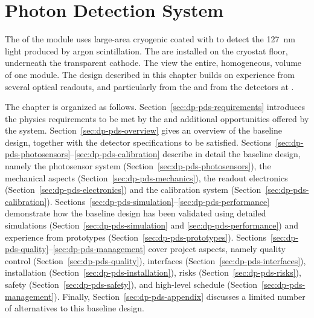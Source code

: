 \chapter{Photon Detection System}
\label{ch:dp-pds}

The  of the \dune \dual module uses large-area cryogenic  coated with  to detect the \SI{127}{\nm} light produced by argon scintillation. The  are installed on the cryostat floor, underneath the  transparent cathode. The   view the entire, homogeneous,  volume of one  module. The design described in this chapter builds on experience from several \lartpc optical readouts, and particularly from the  and from the  detectors at . 

The chapter is organized as follows. Section~\ref{sec:dp-pds-requirements} introduces the physics requirements to be met by the  and additional opportunities offered by the system. Section~\ref{sec:dp-pds-overview} gives an overview of the  baseline design, together with the detector specifications to be satisfied. Sections~\ref{sec:dp-pds-photosensors}--\ref{sec:dp-pds-calibration} describe in detail the  baseline design, namely the  photosensor system (Section~\ref{sec:dp-pds-photosensors}), the mechanical aspects (Section~\ref{sec:dp-pds-mechanics}),  the readout electronics (Section~\ref{sec:dp-pds-electronics}) and the calibration system (Section~\ref{sec:dp-pds-calibration}). Sections~\ref{sec:dp-pds-simulation}--\ref{sec:dp-pds-performance} demonstrate how the  baseline design has been validated using detailed simulations (Section~\ref{sec:dp-pds-simulation} and \ref{sec:dp-pds-performance}) and experience from prototypes (Section~\ref{sec:dp-pds-prototypes}). Sections~\ref{sec:dp-pds-quality}--\ref{sec:dp-pds-management} cover  project aspects, namely quality control (Section~\ref{sec:dp-pds-quality}), interfaces (Section~\ref{sec:dp-pds-interfaces}), installation (Section~\ref{sec:dp-pds-installation}), risks (Section~\ref{sec:dp-pds-risks}), safety (Section~\ref{sec:dp-pds-safety}), and high-level schedule %
(Section~\ref{sec:dp-pds-management}). Finally, Section~\ref{sec:dp-pds-appendix} discusses a limited number of alternatives to this baseline design.  
















